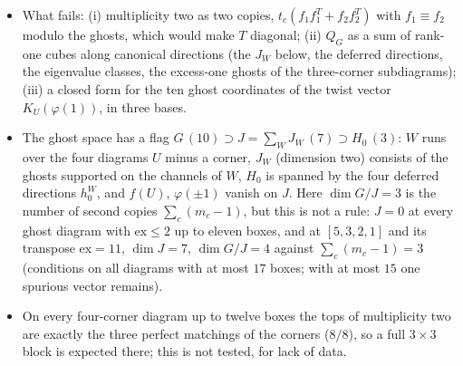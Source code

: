 \documentclass[11pt]{article}
\begin{document}
\begin{itemize}
\begin{align*}
\beta_1&=-\tfrac{12+12\gamma_2+16\gamma_4+21\gamma_6+21\gamma_8+21\gamma_{10}+16\gamma_{12}+10\gamma_{14}+6\gamma_{16}+2\gamma_{18}}{[3]},\\
\alpha_2&=\tfrac{7+7\gamma_2+5\gamma_4+3\gamma_6+2\gamma_8+\gamma_{10}}{[3][5]^2}, &
\beta_2&=-\tfrac{6+10\gamma_2+12\gamma_4+7\gamma_6+3\gamma_8+4\gamma_{10}+3\gamma_{12}+\gamma_{14}}{[3][5]^2},\\
\alpha_3&=\tfrac{39+36\gamma_2+28\gamma_4+18\gamma_6+10\gamma_8+4\gamma_{10}+\gamma_{12}}{[3][5][7]}, &
\beta_3&=-\tfrac{86+76\gamma_2+56\gamma_4+34\gamma_6+16\gamma_8+6\gamma_{10}+2\gamma_{12}}{[3][5][7]};
\end{align*}
the first factor is the rank-one part of $s$ (any symmetric $3\times3$ matrix with non-zero off-diagonal has this form), so
the content is the bracket, linear in $A^2+A^{-2}$, with palindromic numerators that do not factor; at $q=1$, $\beta_c=-2\alpha_c$
and the entry is regular.  The co-tops are diagonal, $s_{cc}N_c=d_c$, with
\[
\frac1{N_{\{[2,2,2,1],[4,1,1,1]\}}}=\frac{A^{10}\,a\,q^{-1}\bigl[qA^{-2}+q^{-1}A^2-(\gamma_{13}+\gamma_{11}+\gamma_9+\gamma_7-\gamma_3
-2\gamma_1)\bigr]}{D_{-6}D_{-4}D_{-3}D_0D_2^2},
\]
where $a=2q\{1\}/(\{2\}^2\{3\}^3\{5\}^2)$; and $\{[4,1,1,1],[4,3]\}$ is its mirror ($A\leftrightarrow1/A$ in the bracket, denominator $D_{-2}^2D_0D_3D_4D_6$).  $Q_G$ is the
Schur complement of the other branch's closed Gram matrix, an explicit finite computation; it has no product form.
\item What fails: (i) multiplicity two as two copies, $t_c(f_1f_1^T+f_2f_2^T)$ with $f_1\equiv f_2$ modulo the ghosts,
which would make $T$ diagonal; (ii) $Q_G$ as a sum of rank-one cubes along canonical directions (the $J_W$ below, the
deferred directions, the eigenvalue classes, the excess-one ghosts of the three-corner subdiagrams); (iii) a closed
form for the ten ghost coordinates of the twist vector $K_U(\varphi(1))$, in three bases.
\item The ghost space has a flag $G\,(10)\supset J=\sum_WJ_W\,(7)\supset H_0\,(3)$: $W$ runs over the four diagrams $U$
minus a corner, $J_W$ (dimension two) consists of the ghosts supported on the channels of $W$, $H_0$ is spanned by the four
deferred directions $h_0^W$, and $f(U)$, $\varphi(\pm1)$ vanish on $J$.  Here $\dim G/J=3$ is the number of second
copies $\sum_c(m_c-1)$, but this is not a rule: $J=0$ at every ghost diagram with $\mathrm{ex}\le2$ up to eleven boxes, and at
$[5,3,2,1]$ and its transpose $\mathrm{ex}=11$, $\dim J=7$, $\dim G/J=4$ against $\sum_c(m_c-1)=3$ (conditions on all
diagrams with at most $17$ boxes; with at most $15$ one spurious vector remains).
\item On every four-corner diagram up to twelve boxes the tops of multiplicity two are exactly the three perfect
matchings of the corners ($8/8$), so a full $3\times3$ block is expected there; this is not tested, for lack of data.
\end{itemize}
\end{document}
